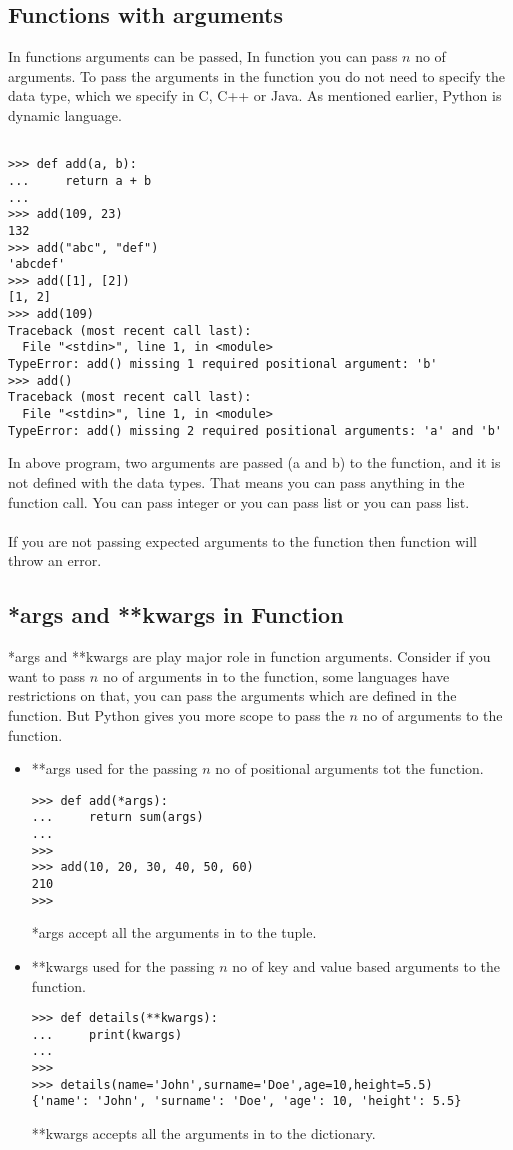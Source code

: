\documentclass[letterpaper,12pt]{book}
\begin{document}
\subsection{Functions with arguments}
In functions arguments can be passed, In function you can pass $n$ no of arguments. To pass the arguments in the function you do not need to specify the data type, which we specify in C, C++ or Java. As mentioned earlier, Python is dynamic language. 
\begin{verbatim}

>>> def add(a, b):
...     return a + b
... 
>>> add(109, 23)
132
>>> add("abc", "def")
'abcdef'
>>> add([1], [2])
[1, 2]
>>> add(109)
Traceback (most recent call last):
  File "<stdin>", line 1, in <module>
TypeError: add() missing 1 required positional argument: 'b'
>>> add()
Traceback (most recent call last):
  File "<stdin>", line 1, in <module>
TypeError: add() missing 2 required positional arguments: 'a' and 'b'
\end{verbatim}
In above program, two arguments are passed (a and b) to the function, and it is not defined with the data types. That means you can pass anything in the function call. You can pass integer or you can pass list or you can pass list.
\paragraph{}
If you are not passing expected arguments to the function then function will throw an error.

\subsection{*args and **kwargs in Function}
*args and **kwargs are play major role in function arguments. Consider if you want to pass $n$ no of arguments in to the function, some languages have restrictions on that, you can pass the arguments which are defined in the function. But Python gives you more scope to pass the $n$ no of arguments to the function. 

\begin{itemize}
\item **args used for the passing $n$ no of positional arguments tot the function.
\begin{verbatim}
>>> def add(*args):
...     return sum(args)
... 
>>> 
>>> add(10, 20, 30, 40, 50, 60)
210
>>> 
\end{verbatim}
*args accept all the arguments in to the tuple.
\item **kwargs used for the passing $n$ no of key and value based arguments to the function.
\begin{verbatim}
>>> def details(**kwargs):
...     print(kwargs)
... 
>>> 
>>> details(name='John',surname='Doe',age=10,height=5.5)
{'name': 'John', 'surname': 'Doe', 'age': 10, 'height': 5.5}
\end{verbatim}
**kwargs accepts all the arguments in to the dictionary.
\end{itemize}
\end{document}
